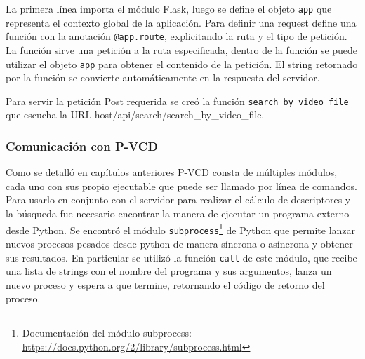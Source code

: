 La primera línea importa el módulo Flask, luego se define el objeto \texttt{app} que representa el contexto global de la aplicación. Para definir una request define una función con la anotación \texttt{@app.route}, explicitando la ruta y el tipo de petición. La función sirve una petición a la ruta especificada, dentro de la función se puede utilizar el objeto \texttt{app} para obtener el contenido de la petición. El string retornado por la función se convierte automáticamente en la respuesta del servidor.

Para servir la petición Post requerida se creó la función \texttt{search\_by\_video\_file} que escucha la URL host/api/search/search\_by\_video\_file.

\subsubsection*{Comunicación con P-VCD}
Como se detalló en capítulos anteriores P-VCD consta de múltiples módulos, cada uno con sus propio ejecutable que puede ser llamado por línea de comandos. Para usarlo en conjunto con el servidor para realizar el cálculo de descriptores y la búsqueda fue necesario encontrar la manera de ejecutar un programa externo desde Python.
Se encontró el módulo \texttt{subprocess}\footnote{Documentación del módulo subprocess: \url{https://docs.python.org/2/library/subprocess.html}} de Python que permite lanzar nuevos procesos pesados desde python de manera síncrona o asíncrona y obtener sus resultados. En particular se utilizó la función \texttt{call} de este módulo, que recibe una lista de strings con el nombre del programa y sus argumentos, lanza un nuevo proceso y espera a que termine, retornando el código de retorno del proceso.

